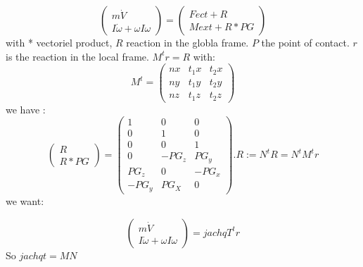 \[\left(\begin{array}{c}m \dot V\\I \dot \omega + \omega I \omega \end{array}\right)= \left(\begin{array}{c}Fect+R\\Mext + R*PG \end{array}\right)\]
  with * vectoriel product, $R$ reaction in the globla frame. $P$ the point of contact.
  $r$ is the reaction in the local frame.  $M^t r=R$ with:
  \[M^t=\left(\begin{array}{ccc} nx&t_1x&t_2x \\ny&t_1y&t_2y\\nz&t_1z&t_2z \end{array}\right)\]
  we have :
  \[\left(\begin{array}{c}R\\R*PG\end{array}\right)=\left(\begin{array}{ccc} 1&0&0\\0&1&0\\0&0&1\\
      0&-PG_z&PG_y\\PG_z&0&-PG_x\\-PG_y&PG_X&0\end{array}\right).R:=N^tR=N^tM^tr\]
      we want:
      
\[\left(\begin{array}{c}m \dot V\\I \dot \omega + \omega I \omega \end{array}\right)=jachqT^t r\]
So $jachqt=MN$
